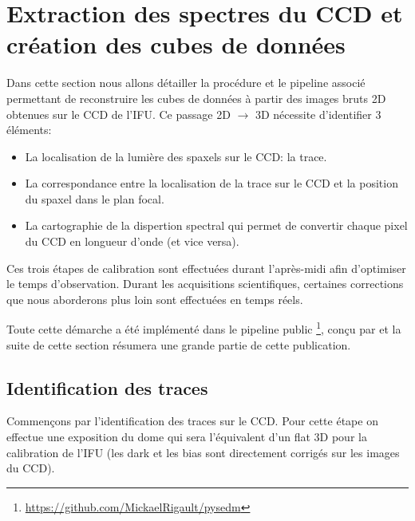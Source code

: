 \documentclass[../main/main.tex]{subfiles}
\begin{document}
\section{Extraction des spectres du CCD et création des cubes de données}
\label{sec:pysedmcube}

Dans cette section nous allons détailler la procédure et le pipeline
associé permettant de reconstruire les cubes de données à partir des
images bruts 2D obtenues sur le CCD de l'IFU. Ce passage 2D
$\rightarrow$ 3D nécessite d'identifier 3 éléments:

\begin{minipage}{\linewidth}
\begin{itemize}[label=$\diamondsuit$]
  \itemsep0em 
   \item La localisation de la lumière des spaxels sur le CCD: la trace.
   \item La correspondance entre la localisation de la trace sur le CCD et
     la position du spaxel dans le plan focal.
   \item La cartographie de la dispertion spectral qui permet de
     convertir chaque pixel du CCD en longueur d'onde (et vice versa).
\end{itemize}
\end{minipage}
\vspace{0.1cm}

Ces trois étapes de calibration sont
effectuées durant l'après-midi afin d'optimiser le temps
d'observation. Durant les acquisitions scientifiques, certaines corrections que nous
aborderons plus loin sont effectuées en temps réels.

Toute cette démarche a été implémenté dans le pipeline public
\pysedm\footnote{\url{https://github.com/MickaelRigault/pysedm}}, conçu
par \citet{pysedm} et la suite de cette section résumera une grande partie de cette
publication.
\subsection{Identification des traces}\label{ssec:tracematch}
Commençons par l'identification des traces sur le CCD. Pour cette
étape on effectue une exposition du dome qui sera l'équivalent d'un flat 3D
pour la calibration de l'IFU (les dark et les bias sont directement
corrigés sur les images du CCD).
\vspace{0.1cm}
\end{document}
